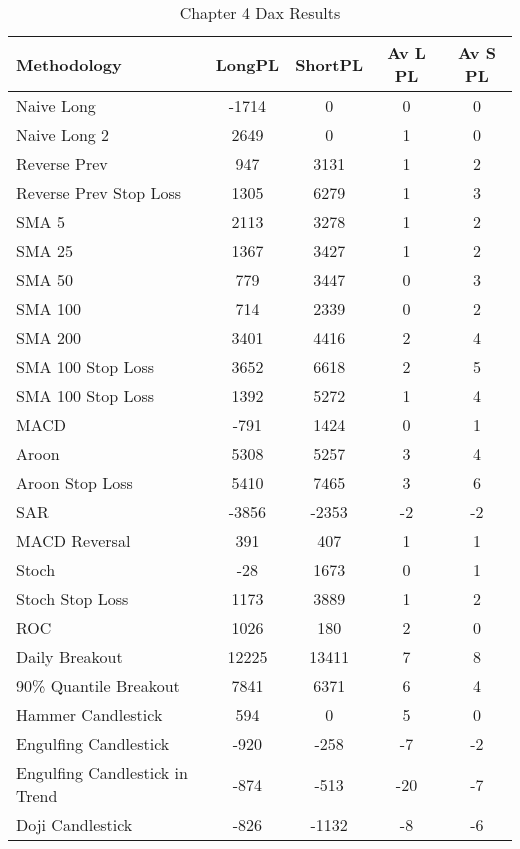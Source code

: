 \begin{table}[ht]
\centering
\caption[Chapter 4 Dax Results]{Chapter 4 Dax Results} 
\label{tab:chp6:dax_summary}
\begin{tabular}{lcccc}
  \toprule Methodology & LongPL & ShortPL & Av L PL & Av S PL \\ 
  \midrule Naive Long & -1714 & 0 & 0 & 0 \\ 
  Naive Long 2 & 2649 & 0 & 1 & 0 \\ 
  Reverse Prev & 947 & 3131 & 1 & 2 \\ 
  Reverse Prev Stop Loss & 1305 & 6279 & 1 & 3 \\ 
  SMA 5 & 2113 & 3278 & 1 & 2 \\ 
  SMA 25 & 1367 & 3427 & 1 & 2 \\ 
  SMA 50 & 779 & 3447 & 0 & 3 \\ 
  SMA 100 & 714 & 2339 & 0 & 2 \\ 
  SMA 200 & 3401 & 4416 & 2 & 4 \\ 
  SMA 100 Stop Loss & 3652 & 6618 & 2 & 5 \\ 
  SMA 100 Stop Loss & 1392 & 5272 & 1 & 4 \\ 
  MACD & -791 & 1424 & 0 & 1 \\ 
  Aroon & 5308 & 5257 & 3 & 4 \\ 
  Aroon Stop Loss & 5410 & 7465 & 3 & 6 \\ 
  SAR & -3856 & -2353 & -2 & -2 \\ 
  MACD Reversal & 391 & 407 & 1 & 1 \\ 
  Stoch & -28 & 1673 & 0 & 1 \\ 
  Stoch Stop Loss & 1173 & 3889 & 1 & 2 \\ 
  ROC & 1026 & 180 & 2 & 0 \\ 
  Daily Breakout & 12225 & 13411 & 7 & 8 \\ 
  90\% Quantile Breakout & 7841 & 6371 & 6 & 4 \\ 
  Hammer Candlestick & 594 & 0 & 5 & 0 \\ 
  Engulfing Candlestick & -920 & -258 & -7 & -2 \\ 
  Engulfing Candlestick in Trend & -874 & -513 & -20 & -7 \\ 
  Doji Candlestick & -826 & -1132 & -8 & -6 \\ 
   \bottomrule \end{tabular}
\end{table}
